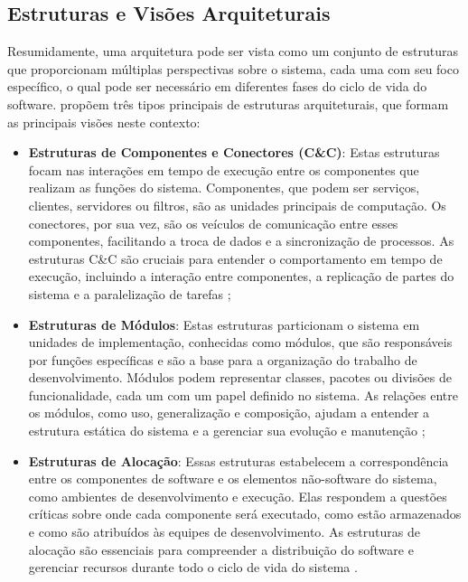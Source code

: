 \subsection{Estruturas e Visões Arquiteturais}

Resumidamente, uma arquitetura pode ser vista como um conjunto de estruturas que proporcionam múltiplas perspectivas sobre o sistema, cada uma com seu foco específico, o qual pode ser necessário em diferentes fases do ciclo de vida do software.  propõem três tipos principais de estruturas arquiteturais, que formam as principais visões neste contexto:

\begin{itemize}

    \item \textbf{Estruturas de Componentes e Conectores (C\&C)}: Estas estruturas focam nas interações em tempo de execução entre os componentes que realizam as funções do sistema. Componentes, que podem ser serviços, clientes, servidores ou filtros, são as unidades principais de computação. Os conectores, por sua vez, são os veículos de comunicação entre esses componentes, facilitando a troca de dados e a sincronização de processos. As estruturas C\&C são cruciais para entender o comportamento em tempo de execução, incluindo a interação entre componentes, a replicação de partes do sistema e a paralelização de tarefas \cite{Bass2021};
    
    \item \textbf{Estruturas de Módulos}: Estas estruturas particionam o sistema em unidades de implementação, conhecidas como módulos, que são responsáveis por funções específicas e são a base para a organização do trabalho de desenvolvimento. Módulos podem representar classes, pacotes ou divisões de funcionalidade, cada um com um papel definido no sistema. As relações entre os módulos, como uso, generalização e composição, ajudam a entender a estrutura estática do sistema e a gerenciar sua evolução e manutenção \cite{Bass2021};
    
    \item \textbf{Estruturas de Alocação}: Essas estruturas estabelecem a correspondência entre os componentes de software e os elementos não-software do sistema, como ambientes de desenvolvimento e execução. Elas respondem a questões críticas sobre onde cada componente será executado, como estão armazenados e como são atribuídos às equipes de desenvolvimento. As estruturas de alocação são essenciais para compreender a distribuição do software e gerenciar recursos durante todo o ciclo de vida do sistema \cite{Bass2021}.
    
\end{itemize}

